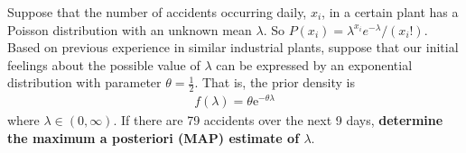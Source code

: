 Suppose that the number of accidents occurring daily, $x_i$, in a certain plant has a 
Poisson distribution with an unknown mean $\lambda$. So $P(x_i) = \lambda^{x_i} e^{-\lambda}/(x_i!)$.
Based on previous experience in similar industrial plants, 
suppose that our initial feelings about the possible value of $\lambda$ 
can be expressed by an exponential distribution with parameter $\theta=\tfrac{1}{2}$. 
That is, the prior density is
%
\begin{align*}
f(\lambda)=\theta \textrm{e}^{-\theta\lambda}
\end{align*}
%
%
where $\lambda\in (0,\infty)$. 
If there are 79 accidents over the next 9 days, \textbf{determine the maximum a posteriori (MAP) estimate of  $\lambda$}. 

